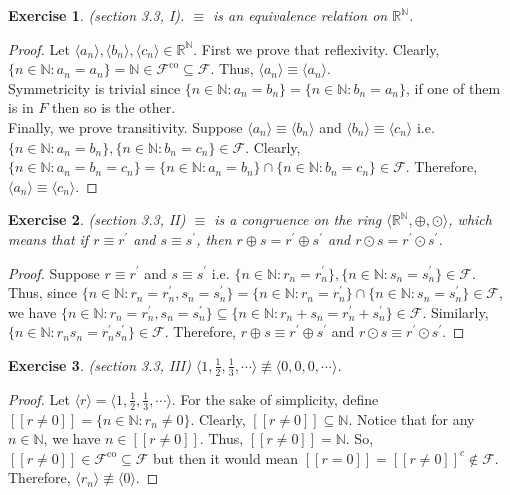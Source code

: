 \documentclass[a4paper, 11pt, openany]{book}
\theoremstyle{plain}
\newtheorem{exercise}{Exercise}[chapter]
\theoremstyle{plain}
\newcommand{\mc}{\mathcal}
\newcommand{\co}{\text{co}}
\newcommand{\N}{\mathbb{N}}
\newcommand{\R}{\mathbb{R}}
\newcommand{\la}{\langle}
\newcommand{\ra}{\rangle}
\newcommand{\op}{\oplus}
\newcommand{\od}{\odot}
\newcommand{\p}{\prime}
\begin{document}
  \begin{exercise}
    (section 3.3, I). $\equiv$ is an equivalence relation on $\R^\N$.
  \end{exercise}
  \begin{proof} Let $\langle a_n \rangle, \langle b_n \rangle, \langle c_n \rangle \in \R^\N$.
    First we prove that reflexivity. Clearly, $\{n \in \N: a_n=a_n\}=\N \in \mc{F}^\co \subseteq \mc{F}$. Thus, $\langle a_n \rangle \equiv \langle a_n \rangle$. \\
    Symmetricity is trivial since $\{n \in \N: a_n=b_n\}=\{n \in \N: b_n=a_n\}$, if one of them is in $F$ then so is the other. \\
    Finally, we prove transitivity. Suppose $\la a_n \ra \equiv \la b_n \ra$ and $\la b_n \ra \equiv \la c_n \ra$ i.e. $\{n \in \N: a_n=b_n\}, \{n \in \N: b_n=c_n\} \in \mc{F}$. Clearly, $\{n \in \N: a_n=b_n=c_n\}=\{n \in \N: a_n=b_n\} \cap \{n \in \N: b_n=c_n\} \in \mc{F}$. Therefore, $\la a_n \ra \equiv \la c_n \ra$.
  \end{proof}
  \begin{exercise} (section 3.3, II)
    $\equiv$ is a congruence on the ring $\la \R^\N, \op, \od \ra$, which means that if $r \equiv r^\p$ and $s \equiv s^\p$, then $r \op s=r^\p \op s^\p$ and $r \od s=r^\p \od s^\p$.
  \end{exercise}
  \begin{proof}
    Suppose $r \equiv r^{\p}$ and $s \equiv s^{\p}$ i.e. $ \{n \in \N: r_n=r^\p_n \}, \{n \in \N: s_n=s_n^\p \} \in \mc{F}$. Thus, since $ \{n \in \N: r_n=r_n^\p, s_n=s_n^\p \}=\{n \in \N: r_n=r_n^\p \} \cap \{n \in \N: s_n=s_n^\p \} \in \mc{F}$, we have $\{n \in \N: r_n=r_n^\p, s_n=s_n^\p \} \subseteq \{n \in \N: r_n+s_n=r_n^\p+s_n^\p \} \in \mc{F}$. Similarly, $\{n \in \N: r_ns_n=r_n^\p s_n^\p \} \in \mc{F}$. Therefore, $r\op s \equiv r^\p \op s^\p$ and $r \od s \equiv r^\p \od s^\p$.
  \end{proof}
  \begin{exercise} (section 3.3, III)
    $\la 1, \frac{1}{2}, \frac{1}{3}, \cdots \ra \not \equiv \la 0, 0, 0, \cdots \ra$. 
  \end{exercise}
  \begin{proof}
    Let $\la r \ra=\la 1, \frac{1}{2}, \frac{1}{3}, \cdots \ra$. For the sake of simplicity, define $[[r \not =0]]=\{n \in \N:r_n \not =0\}$. Clearly, $[[r \not =0]] \subseteq \N$. Notice that for any $n \in \N$, we have $n \in [[r \not =0]]$. Thus, $[[r \not =0]]=\N$. So, $[[r \not =0]] \in \mc{F}^\co \subseteq \mc{F}$ but then it would mean $[[r=0]]=[[r \not=0]]^c \notin \mc{F}$. Therefore, $\la r_n \ra \not \equiv \la 0 \ra$.
  \end{proof}
\end{document}
